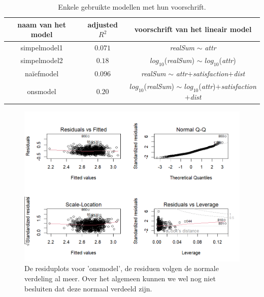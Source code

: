 \documentclass[a4paper]{kulakarticle}
\begin{document}
	\begin{table}[h]
		\centering
		\begin{tabular}{c|c|c}
			\centering
			naam van het model & adjusted $R^2$ & voorschrift van het lineair model \\
			\hline
			simpelmodel1 & $0.071$ & \textit{realSum} $\sim$ \textit{attr}\\
			simpelmodel2 &$0.18$ & $log_{10}$(\textit{realSum}) $\sim$ $log_{10}$(\textit{attr}) \\
			naïefmodel & $0.096$& \textit{realSum} $\sim$ \textit{attr}$+$\textit{satisfaction}$+$\textit{dist}\\
			onsmodel &$0.20$ & $log_{10}$(\textit{realSum}) $\sim$ $log_{10}$(\textit{attr})$+$\textit{satisfaction}$+$\textit{dist}\\
		\end{tabular}
		\caption{Enkele gebruikte modellen met hun voorschrift.}
		\label{rsq}
	\end{table} %





	\begin{figure}
		\centering
		\includegraphics[width=0.9\linewidth]{Figuren/onsmodel}
		\caption{De residuplots voor 'onsmodel', de residuen volgen de normale verdeling al meer. Over het algemeen kunnen we wel nog niet besluiten dat deze normaal verdeeld zijn.}
		\label{fig:onsmodel}
	\end{figure}
	
\end{document}

